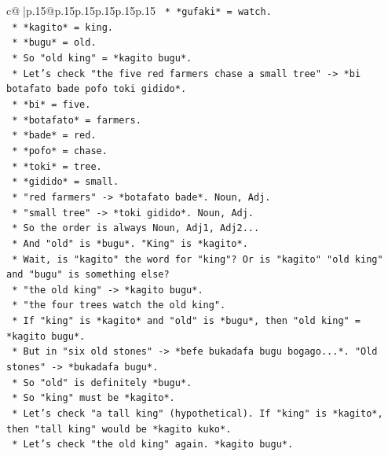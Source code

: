 \documentclass{article}
\begin{document}
{\begin{supertabular}{c@{$\;$}|p{.15\linewidth}@{}p{.15\linewidth}p{.15\linewidth}p{.15\linewidth}p{.15\linewidth}p{.15\linewidth}}
{{{\texttt{                *   *gufaki* = watch.} \\
\texttt{                *   *kagito* = king.} \\
\texttt{                *   *bugu* = old.} \\
\texttt{                *   So "old king" = *kagito bugu*.} \\
\texttt{            *   Let's check "the five red farmers chase a small tree" {-}> *bi botafato bade pofo toki gidido*.} \\
\texttt{                *   *bi* = five.} \\
\texttt{                *   *botafato* = farmers.} \\
\texttt{                *   *bade* = red.} \\
\texttt{                *   *pofo* = chase.} \\
\texttt{                *   *toki* = tree.} \\
\texttt{                *   *gidido* = small.} \\
\texttt{                *   "red farmers" {-}> *botafato bade*. Noun, Adj.} \\
\texttt{                *   "small tree" {-}> *toki gidido*. Noun, Adj.} \\
\texttt{            *   So the order is always Noun, Adj1, Adj2...} \\
\texttt{            *   And "old" is *bugu*. "King" is *kagito*.} \\
\texttt{            *   Wait, is "kagito" the word for "king"? Or is "kagito" "old king" and "bugu" is something else?} \\
\texttt{            *   "the old king" {-}> *kagito bugu*.} \\
\texttt{            *   "the four trees watch the old king".} \\
\texttt{            *   If "king" is *kagito* and "old" is *bugu*, then "old king" = *kagito bugu*.} \\
\texttt{            *   But in "six old stones" {-}> *befe bukadafa bugu bogago...*. "Old stones" {-}> *bukadafa bugu*.} \\
\texttt{            *   So "old" is definitely *bugu*.} \\
\texttt{            *   So "king" must be *kagito*.} \\
\texttt{            *   Let's check "a tall king" (hypothetical). If "king" is *kagito*, then "tall king" would be *kagito kuko*.} \\
\texttt{            *   Let's check "the old king" again. *kagito bugu*.} \\
}}}
\end{supertabular}}
\end{document}
